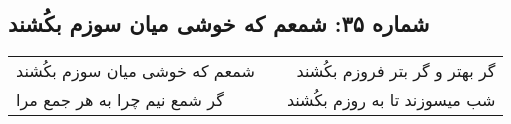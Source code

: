 \begin{center}
\section*{شماره ۳۵: شمعم که خوشی میان سوزم بکُشند}
\label{sec:035}
\begin{longtable}{l p{0.5cm} r}
شمعم که خوشی میان سوزم بکُشند
&&
گر بهتر و گر بتر فروزم بکُشند
\\
گر شمع نیم چرا به هر جمع مرا
&&
شب میسوزند تا به روزم بکُشند
\\
\end{longtable}
\end{center}
